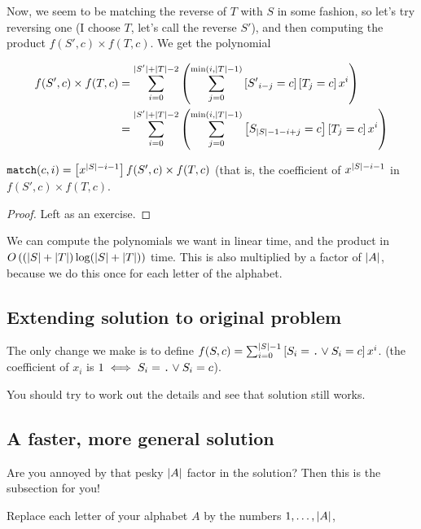 		Now, we seem to be matching the reverse of $T$ with $S$ in some fashion, so
		let's try reversing one (I choose $T$, let's call the reverse $S'$), and then
		computing the product $f(S', c) \times f(T, c)$.
		We get the polynomial

		\begin{align*}
			f(S', c) \times f(T, c) &= 
			\sum_{i = 0}^{\mid S'\mid + \mid T\mid - 2} \left(\sum_{j = 0}^{\min(i, \mid T\mid - 1)}
			\left[{S'}_{i - j} = c\right]\left[T_{j} = c\right] x^i\right)\\
			&= \sum_{i = 0}^{\mid S'\mid + \mid T\mid - 2} \left(\sum_{j = 0}^{\min(i, \mid T\mid - 1)}
			\left[{S}_{\mid S\mid - 1 - i + j} = c\right]\left[T_{j} = c\right] x^i \right)\\
		\end{align*}

		\begin{claim}
			$\texttt{match}(c, i) = \left[x^{\mid S\mid - i - 1}\right] f(S', c)\times f(T, c)$
			(that is, the coefficient of $x^{\mid S\mid - i - 1}$ in $f(S', c) \times f(T, c)$.
		\end{claim}

		\begin{proof}
			Left as an exercise.
		\end{proof}

		We can compute the polynomials we want in linear time, and the product in
		$\bigO{(\card{S} + \card{T}) \log (\card{S} + \card{T})}$ time.
		This is also multiplied by a factor of $\card{A}$, because we do this once
		for each letter of the alphabet.

	\subsection{Extending solution to original problem}
		The only change we make is to define $f(S, c) = 
		\sum_{i = 0}^{\mid S\mid - 1} \left[S_i = \texttt{.} \vee S_i = c\right] x^i$.
		(the coefficient of $x_i$ is $1 \iff S_i = \texttt{.} \vee S_i = c$).

		You should try to work out the details and see that solution still works.

	\subsection{A faster, more general solution}
		Are you annoyed by that pesky $\card{A}$ factor in the solution?
		Then this is the subsection for you!

		Replace each letter of your alphabet $A$ by the numbers $1, \dots , \card{A}$,

